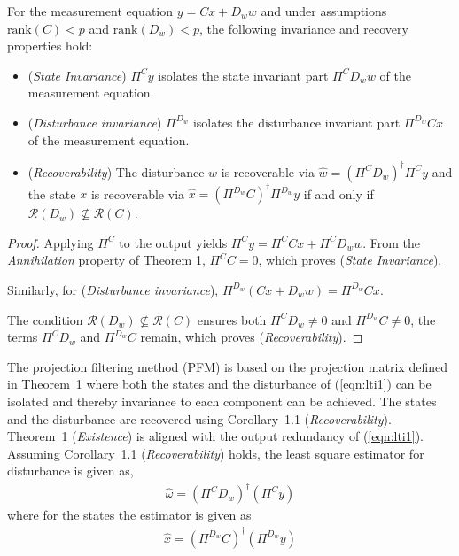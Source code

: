 \begin{corollary}
For the measurement equation $y = Cx + D_w w$ and under assumptions $\mathrm{rank}(C) < p$ and $\mathrm{rank}(D_w) < p$, the following invariance and recovery properties hold:
\begin{itemize}
    \item (\textit{State Invariance}) $\Pi^C y$ isolates the state invariant part $\Pi^C D_w w$ of the measurement equation. 
    \item (\textit{Disturbance invariance}) $\Pi^{D_w}$ isolates the disturbance invariant part $\Pi^{D_w} C x$ of the measurement equation.
    \item (\textit{Recoverability}) The disturbance $w$ is recoverable via $\hat{w} = (\Pi^C D_w)^\dagger \Pi^C y$ and the state $x$ is recoverable via $\hat{x} = (\Pi^{D_w}C)^\dagger \Pi^{D_w} y$ if and only if $\mathcal{R}(D_w) \not\subseteq \mathcal{R}(C)$.
\end{itemize}
\end{corollary}

\begin{proof}
    Applying $\Pi^C$ to the output yields $\Pi^C y = \Pi^C Cx + \Pi^C D_w w$. From the \textit{Annihilation} property of Theorem 1, $\Pi^C C = 0$, which proves (\textit{State Invariance}). 
    
    Similarly, for (\textit{Disturbance invariance}), $\Pi^{D_w} (Cx + D_w w)=\Pi^{D_w} Cx$.
    
    The condition $\mathcal{R}(D_w) \not\subseteq \mathcal{R}(C)$ ensures both $\Pi^C D_w \neq 0$ and $\Pi^{D_w}C\neq 0$, the terms $\Pi^C D_w$ and $\Pi^{D_w} C$ remain, which proves (\textit{Recoverability}).
\end{proof}


The projection filtering method (PFM) is based on the projection matrix defined in Theorem~1 where both the states and the disturbance of (\ref{eqn:lti1}) can be isolated and thereby invariance to each component can be achieved. The states and the disturbance are recovered using Corollary~1.1 (\textit{Recoverability}). Theorem~1 (\textit{Existence}) is aligned with the output redundancy of (\ref{eqn:lti1}). Assuming Corollary~1.1 (\textit{Recoverability}) holds, the least square estimator for disturbance is given as,
\begin{gather}
    \hat{\omega}=(\Pi^C D_w)^\dagger(\Pi^C y)\label{eqn:filtering_w}
\end{gather}
where for the states the estimator is given as
\begin{gather}
    \hat{x}=(\Pi^{D_w}C)^\dagger(\Pi^{D_w} y)\label{eqn:filtering_x}
\end{gather}

